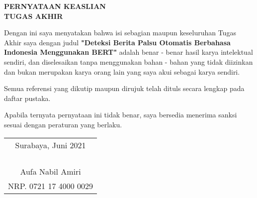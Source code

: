 \begin{center}
  \large
  \textbf{PERNYATAAN KEASLIAN\\TUGAS AKHIR}
\end{center}

\thispagestyle{empty}

\vspace{2ex}

Dengan ini saya menyatakan bahwa isi sebagian maupun keseluruhan Tugas Akhir saya dengan judul \textbf{"Deteksi Berita Palsu Otomatis Berbahasa Indonesia Menggunakan BERT"} adalah benar - benar hasil karya intelektual sendiri, dan diselesaikan tanpa menggunakan bahan - bahan yang tidak diizinkan dan bukan merupakan karya orang lain yang saya akui sebagai karya sendiri.

Semua referensi yang dikutip maupun dirujuk telah dituls secara lengkap pada daftar pustaka.

Apabila ternyata pernyataan ini tidak benar, saya bersedia menerima sanksi sesuai dengan peraturan yang berlaku.

\vspace{4ex}

\begin{flushright}
  \begin{tabular}[b]{c}
    Surabaya, Juni 2021 \\
    \\
    \\
    \\
    \\
    Aufa Nabil Amiri    \\
    NRP. 0721 17 4000 0029
  \end{tabular}
\end{flushright}
